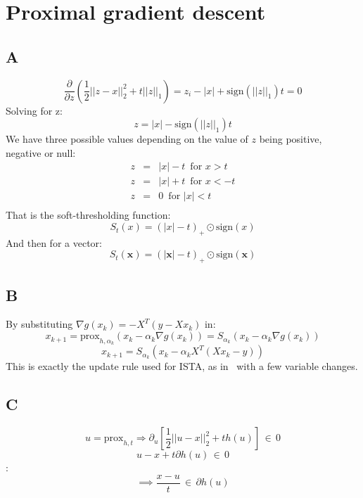 \documentclass{article}
\begin{document}
\section{Proximal gradient descent}
\subsection{A}
$$
\frac{\partial }{\partial z}(\frac{1}{2}||z-x||^2_2+t||z||_1)=z_i-|x|+\mathrm{ sign}(||z||_1)t=0
$$
 Solving for z:
 $$
 z=|x|-\mathrm{ sign}(||z||_1)t
 $$
We have three possible values depending on the value of $z$ being positive, negative or null:
 \begin{eqnarray*}
 z&=&|x| -t \,\,\, \mathrm{for } \,\,x>t\\
 z&=&|x| +t\,\,\, \mathrm{for } \,\,x<-t\\
 z&=&0\,\,\, \mathrm{for } \,\,|x|<t\\
  \end{eqnarray*}
 That is the soft-thresholding function:
 $$
 S_t(x)={(|x|-t)}_+\odot \mathrm{sign}(x)  
 $$
And then for a vector:
 \begin{equation}\label{soft}
 S_t(\mathbf{x})={(|\mathbf{x}|-t)}_+\odot \mathrm{sign}(\mathbf{x})  
 \end{equation}

\subsection{B}
By substituting $\nabla g(x_k) = -X^T(y-Xx_k)$ in:
$$
x_{k+1}=\mathrm{prox}_{h,\alpha_k}(x_k-\alpha_k\nabla g(x_k)) = S_{\alpha_k}(x_k-\alpha_k\nabla g(x_k))
$$
$$
x_{k+1} = S_{\alpha_k}{(x_{k} - \alpha_{k}X^T(Xx_{k}-y))}
$$
This is exactly the update rule used for ISTA, as in~\cite{mairal2014sparse} with a few variable changes.

\subsection{C}
$$
u=\mathrm{prox}_{h,t}\Rightarrow \partial_u[\frac{1}{2}||u-x||^2_2+th(u)] \,\in \,0
$$
$$
u-x+t\partial h(u)\,\in \,0
$$
:
$$
\implies \frac{x-u}{t}\,\in \,\partial h(u)
$$
\end{document}
